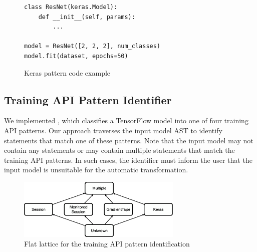 \begin{figure}[ht!]
  \begin{lstlisting}[style=mpython]
class ResNet(keras.Model):
    def __init__(self, params):
        ...

model = ResNet([2, 2, 2], num_classes)
model.fit(dataset, epochs=50)\end{lstlisting}
 
  \caption{Keras pattern code example}
  \label{fig:keraspattern}
\end{figure}


\subsection{Training API Pattern Identifier}\label{sec:ident}
We implemented \tapi, which classifies a TensorFlow model into one of four
training API patterns. 
Our approach traverses the input model AST to identify statements that match
one of these patterns. 
Note that the input model may not contain any statements or may contain
multiple statements that match the training API patterns. 
In such cases, the identifier must inform the user that the input model is
unsuitable for the automatic transformation.

\begin{figure}[ht!]
  \centering
  \includegraphics[width=0.7\textwidth]{Fig13.eps}
  \caption{Flat lattice for the training API pattern identification}
  \label{fig:pattern:lattice}
\end{figure}

